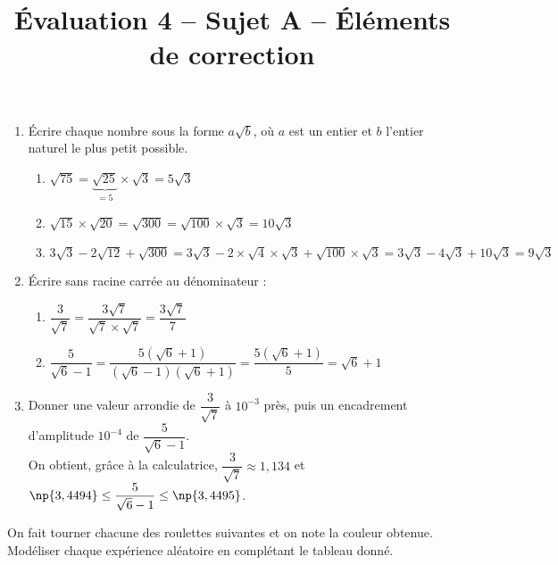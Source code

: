 \documentclass[a4paper,dvipsnames]{article}
\begin{document}
\title{Évaluation 4 -- Sujet A -- Éléments de correction}
\author{}
\date{}

\maketitle{}

\pagestyle{empty}

\exo\vspace{-2mm} 
\begin{enumerate}
  \item Écrire chaque nombre sous la forme $a\sqrt{b}$, où $a$ est un entier et $b$ l'entier naturel le plus petit possible.

    \begin{enumerate}
      \item {\color{red}$\sqrt{75}=\underbrace{\sqrt{25}}_{=5}\times\sqrt{3}=5\sqrt{3}$}
      \item {\color{red}$\sqrt{15}\times\sqrt{20}=\sqrt{300}=\sqrt{100}\times\sqrt{3}=10\sqrt{3}$}
      \item {\color{red}$3\sqrt{3}-2\sqrt{12}+\sqrt{300}=3\sqrt{3}-2\times\sqrt{4}\times\sqrt{3}+\sqrt{100}\times\sqrt{3}=3\sqrt{3}-4\sqrt{3}+10\sqrt{3}=9\sqrt{3}$}
    \end{enumerate}
  \item Écrire sans racine carrée au dénominateur :

    \begin{enumerate}
      \item {\color{red}$\dfrac{3}{\sqrt{7}}=\dfrac{3\sqrt{7}}{\sqrt{7}\times\sqrt{7}}=\dfrac{3\sqrt{7}}{7}$}
      \item {\color{red}$\dfrac{5}{\sqrt{6}-1}=\dfrac{5(\sqrt{6}+1)}{(\sqrt{6}-1)(\sqrt{6}+1)}=\dfrac{5(\sqrt{6}+1)}{5}=\sqrt{6}+1$}
    \end{enumerate} 

  \item Donner une valeur arrondie de $\dfrac{3}{\sqrt{7}}$ à $10^{-3}$ près, puis un encadrement d'amplitude $10^{-4}$ de $\dfrac{5}{\sqrt{6}-1}$.\\
    On obtient, grâce à la calculatrice, {\color{red}$\dfrac{3}{\sqrt{7}}\approx 1,134$} et {\color{red}$\np{3,4494}\leq \dfrac{5}{\sqrt{6}-1}\leq \np{3,4495}$}.
\end{enumerate}

\bigskip

\exo On fait tourner chacune des roulettes suivantes et on note la couleur obtenue. Modéliser chaque expérience aléatoire en complétant le tableau donné.
\end{document}
